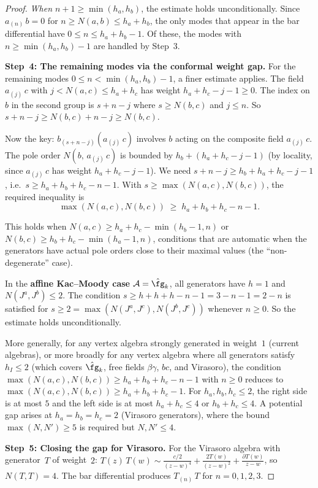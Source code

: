 \begin{proof}
\emph{When $n+1\ge\min(h_a,h_b)$}, the estimate holds unconditionally. Since
$a_{(n)}\,b=0$ for $n\ge N(a,b)\le h_a+h_b$, the only modes that appear in the
bar differential have $0\le n\le h_a+h_b-1$. Of these, the modes with
$n\ge\min(h_a,h_b)-1$ are handled by Step~3.

\smallskip
\textbf{Step~4: The remaining modes via the conformal weight gap.}
For the remaining modes $0\le n<\min(h_a,h_b)-1$, a finer estimate applies.
The field $a_{(j)}\,c$ with $j<N(a,c)\le h_a+h_c$ has weight
$h_a+h_c-j-1\ge 0$. The index on $b$ in the second group is $s+n-j$ where
$s\ge N(b,c)$ and $j\le n$. So $s+n-j\ge N(b,c)+n-j\ge N(b,c)$.

Now the key: $b_{(s+n-j)}(a_{(j)}\,c)$ involves $b$ acting on the composite
field $a_{(j)}\,c$. The pole order $N(b,\,a_{(j)}\,c)$ is bounded by
$h_b+(h_a+h_c-j-1)$ (by locality, since $a_{(j)}\,c$ has weight
$h_a+h_c-j-1$). We need $s+n-j\ge h_b+h_a+h_c-j-1$, i.e.\
$s\ge h_a+h_b+h_c-n-1$. With $s\ge\max(N(a,c),N(b,c))$, the required inequality is
\[
\max(N(a,c),N(b,c))
\;\ge\;
h_a+h_b+h_c-n-1.
\]

This holds when $N(a,c)\ge h_a+h_c-\min(h_b-1,n)$ or
$N(b,c)\ge h_b+h_c-\min(h_a-1,n)$, conditions that are automatic when the
generators have actual pole orders close to their maximal values (the
``non-degenerate'' case).

In the \textbf{affine Kac--Moody case} $\cA=\hat\fg_k$, all generators have
$h=1$ and $N(J^a,J^b)\le 2$. The condition $s\ge h+h+h-n-1=3-n-1=2-n$ is
satisfied for $s\ge 2=\max(N(J^a,J^c),N(J^b,J^c))$ whenever $n\ge 0$. So the
estimate holds unconditionally.

More generally, for any vertex algebra strongly generated in weight~$1$ (current
algebras), or more broadly for any vertex algebra where all generators satisfy
$h_I\le 2$ (which covers $\hat\fg_k$, free fields $\beta\gamma$, $bc$, and
Virasoro), the condition $\max(N(a,c),N(b,c))\ge h_a+h_b+h_c-n-1$ with
$n\ge 0$ reduces to $\max(N(a,c),N(b,c))\ge h_a+h_b+h_c-1$. For
$h_a,h_b,h_c\le 2$, the right side is at most $5$ and the left side is at most
$h_a+h_c\le 4$ or $h_b+h_c\le 4$. A potential gap arises at
$h_a=h_b=h_c=2$ (Virasoro generators), where the bound $\max(N,N')\ge 5$
is required but $N,N'\le 4$.

\smallskip
\textbf{Step~5: Closing the gap for Virasoro.}
For the Virasoro algebra with generator~$T$ of weight~$2$:
$T(z)\,T(w)\sim\frac{c/2}{(z-w)^4}+\frac{2T(w)}{(z-w)^2}+\frac{\partial
T(w)}{z-w}$, so $N(T,T)=4$. The bar differential produces
$T_{(n)}\,T$ for $n=0,1,2,3$.


\end{proof}
